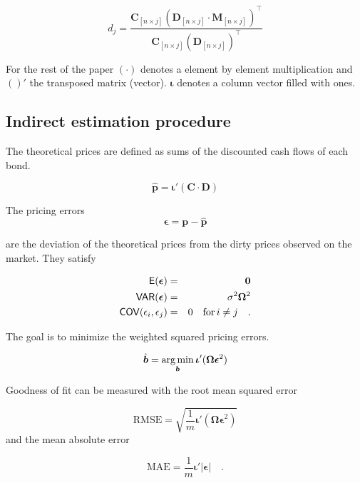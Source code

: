 \begin{equation}\label{duration}
d_j= \frac{\bm{C}_{\left[n \times j\right]} \left(\bm{D}_{\left[n\times j\right]} \cdot \bm{M}_{\left[n\times j\right]}\right)^{\top}} {\bm{C}_{\left[n \times j\right]}\left(\bm{D}_{\left[n\times j\right]}\right)^{\top}}
\end{equation}



For the rest of the paper $(\cdot)$ denotes a element by element multiplication and $( )'$ the transposed matrix (vector). $\bm{\iota}$ denotes a column vector filled with ones.

\subsection{Indirect estimation procedure}
\label{sec:estimation}

The theoretical prices are defined as sums of the discounted cash flows of each bond.

\begin{equation}
  \label{eq:theorprices}
  \bm{\hat{p}} = \bm{\iota}'(\bm{C}\cdot\bm{D})
\end{equation}



The pricing errors
\begin{equation}
  \label{eq:pricingerrors}
  \bm{\epsilon} = \bm{p-\hat{p}}
\end{equation}

are the deviation of the theoretical prices from the dirty prices observed on the market. They satisfy

\begin{eqnarray}
  \label{eq:residuals}
  \mathsf{E}(\bm{\epsilon}) &=& \bm{0}\\
  \mathsf{VAR}(\bm{\epsilon}) &=&\sigma^2\bm{\Omega}^2 \\
  \mathsf{COV}(\epsilon_i, \epsilon_j) &=& 0 \quad \mbox{for}\,i\neq j\quad .
\end{eqnarray}

The goal is to minimize the weighted squared pricing errors.


\begin{equation}
  \label{eq:optimalparam}
  \hat{\bm{b}}= \operatorname*{arg\,min}_{\bm{b}}\bm{\iota}'(\bm{\Omega}\bm{\epsilon}^2)
\end{equation}

Goodness of fit can be measured with the root mean squared error

\begin{equation}
  \label{eq:rmse}
  \mbox{RMSE}=\sqrt{\frac{1}{m}\bm{\iota}'(\bm{\Omega\epsilon}^2)}
\end{equation}
and the mean absolute error

\begin{equation}
  \label{eq:mae}
  \mbox{MAE}=\frac{1}{m}\bm{\iota}'|\bm{\epsilon}|\quad.
\end{equation}


